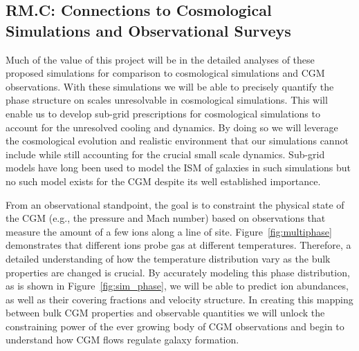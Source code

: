 \documentclass[11pt,letterpaper,english]{article}
\begin{document}
\vspace{-.25in}
\subsection{RM.C: Connections to Cosmological Simulations and Observational Surveys}
\vspace{-.2in}

Much of the value of this project will be in the detailed analyses of these proposed simulations for comparison to cosmological simulations and CGM observations. With these simulations we will be able to precisely quantify the phase structure on scales unresolvable in cosmological simulations. This will enable us to develop sub-grid prescriptions for cosmological simulations to account for the unresolved cooling and dynamics. By doing so we will leverage the cosmological evolution and realistic environment that our simulations cannot include while still accounting for the crucial small scale dynamics. Sub-grid models have long been used to model the ISM of galaxies in such simulations \cite{SpringelHernquist} but no such model exists for the CGM despite its well established importance. 

From an observational standpoint, the goal is to constraint the physical state of the CGM (e.g., the pressure and Mach number) based on observations that measure the amount of a few ions along a line of site. Figure~\ref{fig:multiphase} demonstrates that different ions probe gas at different temperatures. Therefore, a detailed understanding of how the temperature distribution vary as the bulk properties are changed is crucial. By accurately modeling this phase distribution, as is shown in Figure~\ref{fig:sim_phase}, we will be able to predict ion abundances, as well as their covering fractions and velocity structure. In creating this mapping between bulk CGM properties and observable quantities we will unlock the constraining power of the ever growing body of CGM observations and begin to understand how CGM flows regulate galaxy formation.


\end{document}
